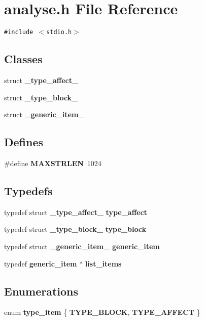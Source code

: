 \section{analyse.h File Reference}
\label{analyse_8h}
{\tt \#include $<$stdio.h$>$}\par
\subsection*{Classes}
\begin{CompactItemize}
\item 
struct {\bf \_\-type\_\-affect\_\-}
\item 
struct {\bf \_\-type\_\-block\_\-}
\item 
struct {\bf \_\-generic\_\-item\_\-}
\end{CompactItemize}
\subsection*{Defines}
\begin{CompactItemize}
\item 
\#define {\bf MAXSTRLEN}~1024
\end{CompactItemize}
\subsection*{Typedefs}
\begin{CompactItemize}
\item 
typedef struct {\bf \_\-type\_\-affect\_\-} {\bf type\_\-affect}
\item 
typedef struct {\bf \_\-type\_\-block\_\-} {\bf type\_\-block}
\item 
typedef struct {\bf \_\-generic\_\-item\_\-} {\bf generic\_\-item}
\item 
typedef {\bf generic\_\-item} $\ast$ {\bf list\_\-items}
\end{CompactItemize}
\subsection*{Enumerations}
\begin{CompactItemize}
\item 
enum {\bf type\_\-item} \{ {\bf TYPE\_\-BLOCK}, 
{\bf TYPE\_\-AFFECT}
 \}
\end{CompactItemize}
